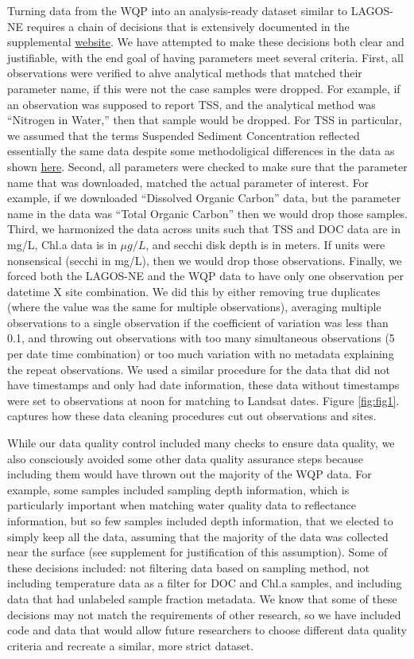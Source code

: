\documentclass[]{article}
\begin{document}
Turning data from the WQP into an analysis-ready dataset similar to
LAGOS-NE requires a chain of decisions that is extensively documented in
the supplemental \href{link}{website}. We have attempted to make these
decisions both clear and justifiable, with the end goal of having
parameters meet several criteria. First, all observations were verified
to ahve analytical methods that matched their parameter name, if this
were not the case samples were dropped. For example, if an observation
was supposed to report TSS, and the analytical method was ``Nitrogen in
Water,'' then that sample would be dropped. For TSS in particular, we
assumed that the terms Suspended Sediment Concentration reflected
essentially the same data despite some methodoligical differences in the
data as shown
\href{https://water.usgs.gov/osw/pubs/WRIR00-4191.pdf}{here}. Second,
all parameters were checked to make sure that the parameter name that
was downloaded, matched the actual parameter of interest. For example,
if we downloaded ``Dissolved Organic Carbon'' data, but the parameter
name in the data was ``Total Organic Carbon'' then we would drop those
samples. Third, we harmonized the data across units such that TSS and
DOC data are in mg/L, Chl.a data is in \(\mu g/L\), and secchi disk
depth is in meters. If units were nonsensical (secchi in mg/L), then we
would drop those observations. Finally, we forced both the LAGOS-NE and
the WQP data to have only one observation per datetime X site
combination. We did this by either removing true duplicates (where the
value was the same for multiple observations), averaging multiple
observations to a single observation if the coefficient of variation was
less than 0.1, and throwing out observations with too many simultaneous
observations (5 per date time combination) or too much variation with no
metadata explaining the repeat observations. We used a similar procedure
for the data that did not have timestamps and only had date information,
these data without timestamps were set to observations at noon for
matching to Landsat dates. Figure \ref{fig:fig1}. captures how these
data cleaning procedures cut out observations and sites.

While our data quality control included many checks to ensure data
quality, we also consciously avoided some other data quality assurance
steps because including them would have thrown out the majority of the
WQP data. For example, some samples included sampling depth information,
which is particularly important when matching water quality data to
reflectance information, but so few samples included depth information,
that we elected to simply keep all the data, assuming that the majority
of the data was collected near the surface (see supplement for
justification of this assumption). Some of these decisions included: not
filtering data based on sampling method, not including temperature data
as a filter for DOC and Chl.a samples, and including data that had
unlabeled sample fraction metadata. We know that some of these decisions
may not match the requirements of other research, so we have included
code and data that would allow future researchers to choose different
data quality criteria and recreate a similar, more strict dataset.
\end{document}
